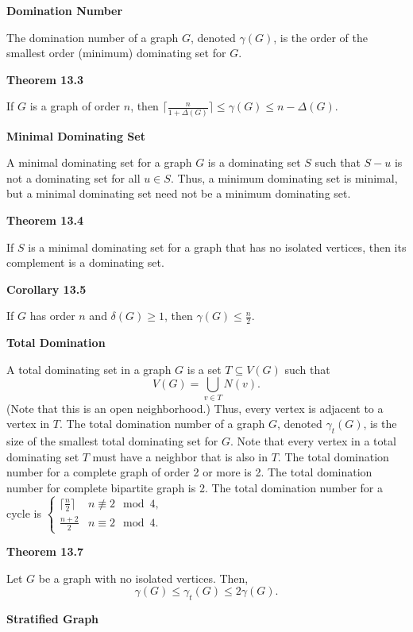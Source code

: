 \documentclass{article}
\begin{document}
\medskip\noindent\textbf{Domination Number}

    The domination number of a graph $G$, denoted $\gamma(G)$, is the order of the smallest order (minimum) dominating set for $G$.

\medskip\noindent\textbf{Theorem 13.3}

    If $G$ is a graph of order $n$, then $\lceil \frac{n}{1+\Delta(G)} \rceil \leq \gamma(G) \leq n - \Delta(G)$.

\medskip\noindent\textbf{Minimal Dominating Set}

    A minimal dominating set for a graph $G$ is a dominating set $S$ such that $S - u$ is not a dominating set for all $u \in S$.
    Thus, a minimum dominating set is minimal, but a minimal dominating set need not be a minimum dominating set.

\medskip\noindent\textbf{Theorem 13.4}

    If $S$ is a minimal dominating set for a graph that has no isolated vertices, then its complement is a dominating set.

\medskip\noindent\textbf{Corollary 13.5}

    If $G$ has order $n$ and $\delta(G) \geq 1$, then $\gamma(G) \leq \frac n2$.

\medskip\noindent\textbf{Total Domination}

    A total dominating set in a graph $G$ is a set $T \subseteq V(G)$ such that $$V(G) = \bigcup_{v \in T} N(v).$$
    (Note that this is an open neighborhood.)
    Thus, every vertex is adjacent to a vertex in $T$.
    The total domination number of a graph $G$, denoted $\gamma_t(G)$, is the size of the smallest total dominating set for $G$.
    Note that every vertex in a total dominating set $T$ must have a neighbor that is also in $T$.
    The total domination number for a complete graph of order 2 or more is 2.
    The total domination number for complete bipartite graph is 2.
    The total domination number for a cycle is $\begin{cases} \lceil\frac n2\rceil & n \not\equiv 2 \mod 4, \\ \frac{n+2}2 & n \equiv 2 \mod 4. \end{cases}$

\medskip\noindent\textbf{Theorem 13.7}

    Let $G$ be a graph with no isolated vertices.
    Then, $$\gamma(G) \leq \gamma_t(G) \leq 2\gamma(G).$$

\medskip\noindent\textbf{Stratified Graph}
\end{document}
